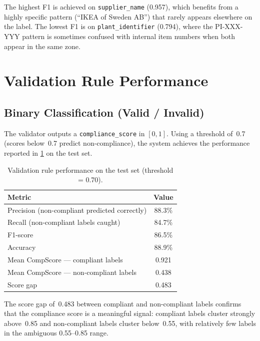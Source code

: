 The highest F1 is achieved on \texttt{supplier\_name} (0.957), which benefits from a
highly specific pattern (``IKEA of Sweden AB'') that rarely appears elsewhere on the label.
The lowest F1 is on \texttt{plant\_identifier} (0.794), where the PI-XXX-YYY pattern is
sometimes confused with internal item numbers when both appear in the same zone.

\section{Validation Rule Performance}

\subsection{Binary Classification (Valid / Invalid)}

The validator outputs a \texttt{compliance\_score} in $[0, 1]$. Using a threshold of~0.7
(scores below~0.7 predict non-compliance), the system achieves the performance reported
in \cref{tab:validation_perf} on the test set.

\begin{table}[h]
\centering
\caption{Validation rule performance on the test set (threshold = 0.70).}
\label{tab:validation_perf}
\begin{tabular}{lc}
\toprule
\textbf{Metric} & \textbf{Value} \\
\midrule
Precision (non-compliant predicted correctly) & 88.3\% \\
Recall (non-compliant labels caught)           & 84.7\% \\
F1-score                                       & 86.5\% \\
Accuracy                                       & 88.9\% \\
\midrule
Mean CompScore — compliant labels              & 0.921 \\
Mean CompScore — non-compliant labels          & 0.438 \\
Score gap                                      & 0.483 \\
\bottomrule
\end{tabular}
\end{table}

The score gap of~0.483 between compliant and non-compliant labels confirms that the
compliance score is a meaningful signal: compliant labels cluster strongly above~0.85 and
non-compliant labels cluster below~0.55, with relatively few labels in the ambiguous
0.55--0.85 range.

